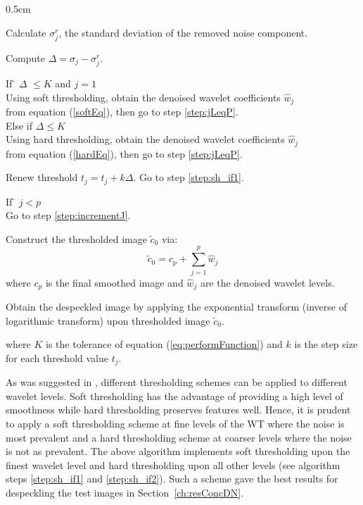 \documentclass[12pt]{report}
\renewcommand{\baselinestretch}{1.5}
\begin{document}
\begin{list}{.}{ 
\renewcommand{\baselinestretch}{1}
\setlength{\labelwidth} {0.5cm} \rm }
	\item Calculate $\sigma_{j}^{r}$, the standard deviation of the removed noise component.

	\item Compute $\Delta = \sigma_{j} - \sigma_{j}^{r}$.
	
	\item 
	\begin{tabbing}
	If \= $\Delta$ $\leq K$ and $j = 1$ \\
	\>Using soft thresholding, obtain the denoised wavelet coefficients $\hat{w}_{j}$ \\ 
	\>from equation (\ref{softEq}), then go to step \ref{step:jLeqP}. \\
	Else if $\Delta \leq K$ \\
	\>Using hard thresholding, obtain the denoised wavelet coefficients $\hat{w}_{j}$ \\
	\>from equation (\ref{hardEq}), then go to step \ref{step:jLeqP}.
	\end{tabbing}
	\label{step:sh_if2}

	\item Renew threshold $t_{j} = t_{j} + k\Delta$. Go to step \ref{step:sh_if1}.

	\item
	\begin{tabbing}
	If \= $j < p$ \\
	\> Go to step \ref{step:incrementJ}.
	\end{tabbing}
	\label{step:jLeqP}

	\item Construct the thresholded image $\tilde{c}_{0}$ via:
	\begin{equation}
		\tilde{c}_{0} = c_{p} + \sum_{j=1}^{p} \hat{w}_{j}
	\end{equation}
	where $c_{p}$ is the final smoothed image and
	$\hat{w}_{j}$ are the denoised wavelet levels.
	
	\item Obtain the despeckled image by applying the exponential transform (inverse of logarithmic
	transform) upon thresholded image $\tilde{c}_{0}$. 
\renewcommand{\baselinestretch}{1.5}
\end{list}
\normalsize
where $K$ is the tolerance of equation (\ref{eq:performFunction}) and $k$ is the step size for each threshold 
value $t_{j}$. 

As was suggested in \cite{zong98},
different thresholding schemes can be applied to different wavelet levels. 
Soft thresholding has the advantage of providing a high level of smoothness while hard thresholding
preserves features well. Hence, it is prudent to apply a soft thresholding scheme at fine levels
of the WT where the noise is most prevalent and a hard thresholding scheme at coarser levels where the 
noise is not as prevalent. 
The above algorithm implements soft thresholding upon the finest wavelet level and hard thresholding upon all other levels
(see algorithm steps \ref{step:sh_if1} and \ref{step:sh_if2}). Such a scheme gave the best results for despeckling 
the test images in Section~\ref{ch:resConcDN}.
\end{document}
